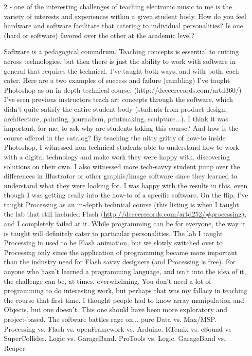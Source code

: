 2 - one of the interesting challenges of teaching electronic music to me is the variety of interests and experiences within a given student body. How do you feel hardware and software facilitate that catering to individual personalities? Is one (hard or software) favored over the other at the academic level? 

Software is a pedagogical conundrum. Teaching concepts is essential to cutting across technologies, but then there is just the ability to work with software in general that requires the technical.  I've taught both ways, and with both, each cater.
Here are a two examples of success and failure (rambling)
 I've taught Photoshop as an in-depth technical course. (http://deecerecords.com/artd360/) I've seen previous instructors teach art concepts through the software, which didn't quite satisfy the entire student body (students from product design, architecture, painting, journalism, printmaking, sculpture...). I think it was important, for me, to ask why are students taking this course? And how is the course offered in the catalog?  By teaching the nitty gritty of how-to inside Photoshop, I witnessed non-technical students able to understand how to work with a digital technology and make work they were happy with, discovering solutions on their own. I also witnessed more tech-savvy student jump over the differences in Illustrator or other graphic/image software since they learned to understand what they were looking for. I was happy with the results in this, even though I was getting really into the how-to of a specific software.
	On the flip, I've taught Processing as an in-depth technical course (this listing is when I taught the lab that still included Flash (\url{http://deecerecords.com/artd252/#processing}), and I completely failed at it. While programming can be for everyone, the way it is taught will definitely cater to particular personalities. The lab I taught Processing in used to be Flash animation, but we slowly switched over to Processing only since the application of programming became more important than the industry need for Flash savvy designers (and Processing is free). For anyone who hasn't learned a programming language, and isn't into the idea of it, the challenge can be, at times, overwhelming. You don't need a lot of programming to do interesting work, but perhaps that was my fallacy in teaching the course that first time.  I thought people had to know array manipulation and Objects, but one doesn't.  This one should have been more exploratory and project-based.
	The software battles rage on...
	pure Data vs. Max/MSP.  
	Processing vs. Flash vs. openFramework vs. Arduino.  
	RTcmix vs. cSound vs SuperCollider.
	Logic vs. GarageBand.  ProTools vs. Logic.  GarageBand vs. Reaper.
	
